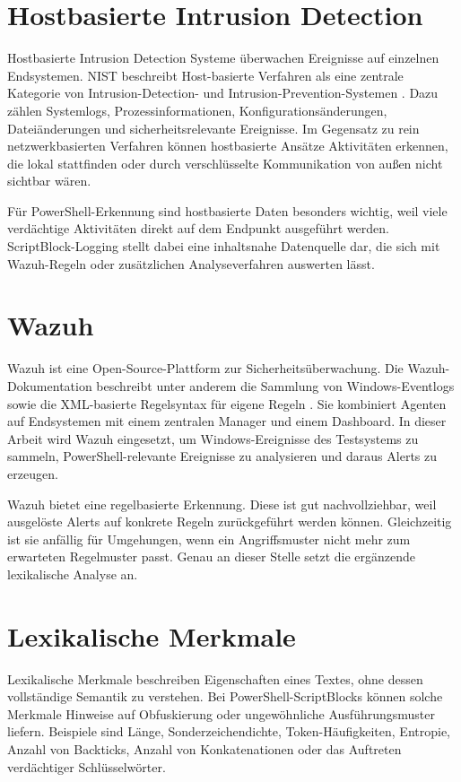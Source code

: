 \documentclass[12pt,a4paper,oneside,parskip=half]{scrreprt}
\begin{document}
\section{Hostbasierte Intrusion Detection}
Hostbasierte Intrusion Detection Systeme überwachen Ereignisse auf einzelnen Endsystemen. NIST beschreibt Host-basierte Verfahren als eine zentrale Kategorie von Intrusion-Detection- und Intrusion-Prevention-Systemen \cite{nist-idps}. Dazu zählen Systemlogs, Prozessinformationen, Konfigurationsänderungen, Dateiänderungen und sicherheitsrelevante Ereignisse. Im Gegensatz zu rein netzwerkbasierten Verfahren können hostbasierte Ansätze Aktivitäten erkennen, die lokal stattfinden oder durch verschlüsselte Kommunikation von außen nicht sichtbar wären.

Für PowerShell-Erkennung sind hostbasierte Daten besonders wichtig, weil viele verdächtige Aktivitäten direkt auf dem Endpunkt ausgeführt werden. ScriptBlock-Logging stellt dabei eine inhaltsnahe Datenquelle dar, die sich mit Wazuh-Regeln oder zusätzlichen Analyseverfahren auswerten lässt.

\section{Wazuh}
Wazuh ist eine Open-Source-Plattform zur Sicherheitsüberwachung. Die Wazuh-Dokumentation beschreibt unter anderem die Sammlung von Windows-Eventlogs sowie die XML-basierte Regelsyntax für eigene Regeln \cite{wazuh-log-collection,wazuh-rules,wazuh-custom-rules}. Sie kombiniert Agenten auf Endsystemen mit einem zentralen Manager und einem Dashboard. In dieser Arbeit wird Wazuh eingesetzt, um Windows-Ereignisse des Testsystems zu sammeln, PowerShell-relevante Ereignisse zu analysieren und daraus Alerts zu erzeugen.

Wazuh bietet eine regelbasierte Erkennung. Diese ist gut nachvollziehbar, weil ausgelöste Alerts auf konkrete Regeln zurückgeführt werden können. Gleichzeitig ist sie anfällig für Umgehungen, wenn ein Angriffsmuster nicht mehr zum erwarteten Regelmuster passt. Genau an dieser Stelle setzt die ergänzende lexikalische Analyse an.

\section{Lexikalische Merkmale}
Lexikalische Merkmale beschreiben Eigenschaften eines Textes, ohne dessen vollständige Semantik zu verstehen. Bei PowerShell-ScriptBlocks können solche Merkmale Hinweise auf Obfuskierung oder ungewöhnliche Ausführungsmuster liefern. Beispiele sind Länge, Sonderzeichendichte, Token-Häufigkeiten, Entropie, Anzahl von Backticks, Anzahl von Konkatenationen oder das Auftreten verdächtiger Schlüsselwörter.
\end{document}
